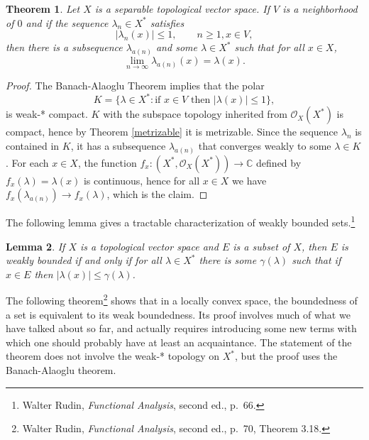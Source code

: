 \documentclass{article}
\newtheorem{theorem}{Theorem}
\newtheorem{lemma}[theorem]{Lemma}
\begin{document}
\begin{theorem}
Let $X$ is a separable topological vector space. If $V$ is a neighborhood of $0$ and if the sequence $\lambda_n \in X^*$ satisfies
\[
|\lambda_n(x)| \leq 1, \qquad n \geq 1, x \in V,
\]
then there is a subsequence $\lambda_{a(n)}$ and some $\lambda \in X^*$ such that for all $x \in X$,
\[
\lim_{n \to \infty} \lambda_{a(n)}(x)= \lambda(x).
\]
\end{theorem}
\begin{proof}
The Banach-Alaoglu Theorem implies that the polar
\[
K=\{\lambda \in X^*:\textrm{if $x \in V$ then $|\lambda(x)| \leq 1$}\},
\]
is weak-* compact. $K$ with the subspace 
topology inherited from $\mathcal{O}_X(X^*)$ is compact, hence by Theorem \ref{metrizable} it is metrizable. 
Since the sequence $\lambda_n$ is contained in $K$, it has a  subsequence $\lambda_{a(n)}$ that converges weakly 
to some $\lambda \in K$. 
For each $x \in X$, the function $f_x:(X^*,\mathcal{O}_X(X^*)) \to \mathbb{C}$ defined by $f_x(\lambda)=\lambda(x)$
is continuous, hence for all $x \in X$ we have $f_x(\lambda_{a(n)}) \to f_x(\lambda)$, which is the claim.
\end{proof}

The following lemma gives a tractable characterization of weakly bounded sets.\footnote{Walter Rudin, {\em Functional Analysis}, second ed., p.~66.}


\begin{lemma}
If $X$ is a topological vector space and $E$ is a subset of $X$, then $E$ is weakly bounded if and only if 
for all $\lambda \in X^*$ there is some $\gamma(\lambda)$ such that if $x \in E$ then $|\lambda(x)| \leq \gamma(\lambda)$.
\label{weakboundedlemma}
\end{lemma}

The following theorem\footnote{Walter Rudin, {\em Functional Analysis}, second ed.,
p.~70, Theorem 3.18.} shows that in  a locally convex space, the boundedness of a set is equivalent to its weak boundedness.
Its proof involves much of what we have talked about so far, and actually
requires introducing some new terms with which one should probably have at least an  acquaintance. The statement of the theorem does not involve
the weak-* topology on $X^*$, but the proof uses the Banach-Alaoglu theorem.
\end{document}
